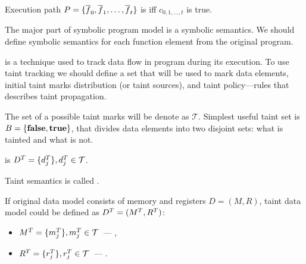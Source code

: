 Execution path $P = \{\overline{f}_0, \overline{f}_1, \dots, \overline{f}_t\}$ is
 iff $c_{0, 1, \dots, t}$ is true.



The major part of symbolic program model is a symbolic semantics.
We should define symbolic semantics for each function element from the original
program.






 is a technique used to track data
flow in program during its execution.
To use taint tracking we should define a set that will be used to mark data
elements, initial taint marks distribution (or taint sources),
and taint policy---rules that describes taint propagation.


The set of a possible taint marks will be denote as $\mathcal{T}$.
Simplest useful taint set is $B = \{\textbf{false}, \textbf{true}\}$,
that divides data elements into two disjoint sets:
what is tainted and what is not.

 is
$D^T = \{d^T_j\}, d^T_j \in \mathcal{T}$.

Taint semantics is called .


If original data model consists of memory and registers $D = (M, R)$,
taint data model could be defined as $D^T = (M^T, R^T)$:

\begin{itemize}
    \item $M^T = \{m^T_j\}, m^T_j \in \mathcal{T}$~---
        ,
    \item $R^T = \{r^T_j\}, r^T_j \in \mathcal{T}$~---
        .
\end{itemize}


